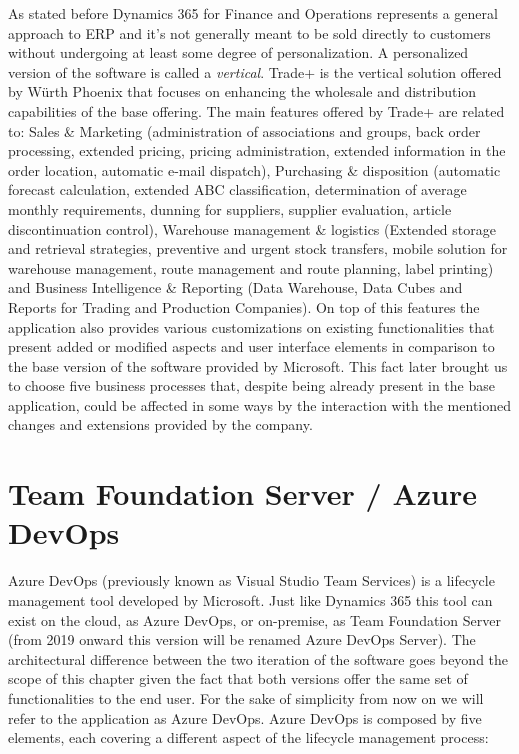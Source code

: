 As stated before Dynamics 365 for Finance and Operations represents a general approach to ERP and it's not generally meant to be sold directly to customers without undergoing at least some degree of personalization. A personalized version of the software is called a \textit{vertical}. Trade+ is the vertical solution offered by Würth Phoenix that focuses on enhancing the wholesale and distribution capabilities of the base offering. The main features offered by Trade+ are related to: 
Sales \& Marketing (administration of associations and groups, back order processing, extended pricing, pricing administration, extended information in the order location, automatic e-mail dispatch), Purchasing \& disposition (automatic forecast calculation, extended ABC classification, determination of average monthly requirements, dunning for suppliers, supplier evaluation, article discontinuation control), Warehouse management \& logistics (Extended storage and retrieval strategies, preventive and urgent stock transfers, mobile solution for warehouse management, route management and route planning, label printing) and Business Intelligence \& Reporting (Data Warehouse, Data Cubes and Reports for Trading and Production Companies).
On top of this features the application also provides various customizations on existing functionalities that present added or modified aspects and user interface elements in comparison to the base version of the software provided by Microsoft. This fact later brought us to choose five business processes that, despite being already present in the base application, could be affected in some ways by the interaction with the mentioned changes and extensions provided by the company.

\section{Team Foundation Server / Azure DevOps} 

Azure DevOps \cite{DevOps} (previously known as Visual Studio Team Services) is a lifecycle management tool developed by Microsoft. Just like Dynamics 365 this tool can exist on the cloud, as Azure DevOps, or on-premise, as Team Foundation Server (from 2019 onward this version will be renamed Azure DevOps Server). The architectural difference between the two iteration of the software goes beyond the scope of this chapter given the fact that both versions offer the same set of functionalities to the end user. For the sake of simplicity from now on we will refer to the application as Azure DevOps. Azure DevOps is composed by five elements, each covering a different aspect of the lifecycle management process:

